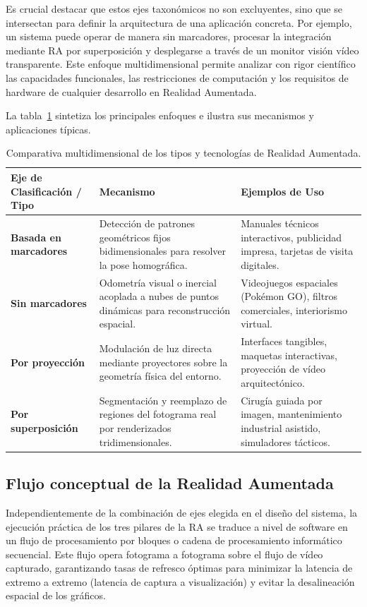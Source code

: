 Es crucial destacar que estos ejes taxonómicos no son excluyentes, sino que se intersectan para definir la arquitectura de una aplicación concreta. Por ejemplo, un sistema puede operar de manera sin marcadores, procesar la integración mediante RA por superposición y desplegarse a través de un monitor visión vídeo transparente. Este enfoque multidimensional permite analizar con rigor científico las capacidades funcionales, las restricciones de computación y los requisitos de hardware de cualquier desarrollo en Realidad Aumentada.

La tabla~\ref{tabla:tiposRA} sintetiza los principales enfoques e ilustra sus mecanismos y aplicaciones típicas.

\begin{table}[H]
\centering
\small
\begin{tabularx}{\textwidth}{l X X}
\toprule
\textbf{Eje de Clasificación / Tipo} & \textbf{Mecanismo} & \textbf{Ejemplos de Uso} \\
\midrule
\textbf{Basada en marcadores} & Detección de patrones geométricos fijos bidimensionales para resolver la pose homográfica. & Manuales técnicos interactivos, publicidad impresa, tarjetas de visita digitales. \\[4pt]
\textbf{Sin marcadores} & Odometría visual o inercial acoplada a nubes de puntos dinámicas para reconstrucción espacial. & Videojuegos espaciales (Pokémon GO), filtros comerciales, interiorismo virtual. \\[4pt]
\textbf{Por proyección} & Modulación de luz directa mediante proyectores sobre la geometría física del entorno. & Interfaces tangibles, maquetas interactivas, proyección de vídeo arquitectónico. \\[4pt]
\textbf{Por superposición} & Segmentación y reemplazo de regiones del fotograma real por renderizados tridimensionales. & Cirugía guiada por imagen, mantenimiento industrial asistido, simuladores tácticos. \\
\bottomrule
\end{tabularx}
\caption{Comparativa multidimensional de los tipos y tecnologías de Realidad Aumentada.}
\label{tabla:tiposRA}
\end{table}

\subsection{Flujo conceptual de la Realidad Aumentada}

Independientemente de la combinación de ejes elegida en el diseño del sistema, la ejecución práctica de los tres pilares de la RA se traduce a nivel de software en un flujo de procesamiento por bloques o cadena de procesamiento informático secuencial. Este flujo opera fotograma a fotograma sobre el flujo de vídeo capturado, garantizando tasas de refresco óptimas para minimizar la latencia de extremo a extremo (latencia de captura a visualización) y evitar la desalineación espacial de los gráficos.

